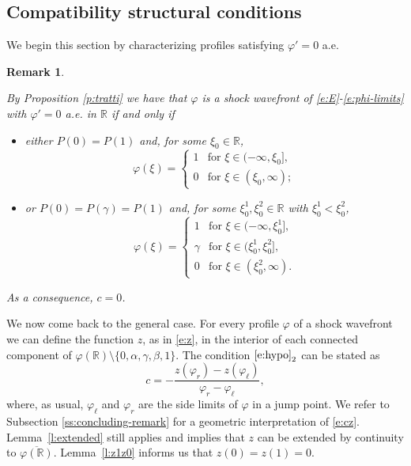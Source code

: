 \documentclass[11pt,a4paper]{article}
\newtheorem{remark}{Remark}[section]
\renewcommand{\phi}{\varphi}
\begin{document}
\subsection{Compatibility structural conditions}
\label{sec:necessary}

We begin this section by characterizing profiles satisfying $\phi'=0$ a.e.

\begin{remark}
\label{rem:2jumps}
{\rm 
By Proposition \ref{p:tratti} we have that $\phi$ is a shock wavefront of \eqref{e:E}-\eqref{e:phi-limits} with  $\phi'=0$ a.e. in $\mathbb{R}$ if and only if \begin{itemize}
\item either $P(0)=P(1)$ and, for some $\xi_0 \in \mathbb{R}$,
\[
\phi(\xi)=\begin{cases}
1 & \text{for } \xi \in (-\infty,\xi_0], \\%
0 & \text{for } \xi \in (\xi_0,\infty);
\end{cases}
\]

\item or $P(0)=P(\gamma)=P(1)$ and, for some $\xi_0^1, \xi_0^2 \in \mathbb{R}$ with $\xi_0^1 < \xi_0^2$,
\[
\phi(\xi)=\begin{cases}
1 & \text{for } \xi \in (-\infty, \xi_0^1], \\%
\gamma & \text{for } \xi \in (\xi_0^1, \xi_0^2], \\%
0 & \text{for } \xi \in (\xi_0^2,\infty).
\end{cases}
\]
\end{itemize}
As a consequence, $c=0$.}
\end{remark}
We now come back to the general case. For every profile $\varphi$ of a shock wavefront we can define the function $z$, as in \eqref{e:z}, in the interior of each connected component of $\varphi(\mathbb{R}) \setminus \{0, \alpha, \gamma, \beta, 1\}$. The condition $\eqref{e:hypo}_2$ can be stated as
\begin{equation}\label{e:cz}
c=-\frac{z(\phi_r)-z(\phi_\ell)}{\phi_r-\phi_\ell},
\end{equation}
where, as usual, $\phi_{\ell}$ and $\phi_r$ are the side limits of $\phi$ in a jump point. We refer to Subsection \ref{ss:concluding-remark} for a geometric interpretation of \eqref{e:cz}. Lemma~\ref{l:extended} still applies and implies that $z$ can be extended by continuity to $\overline{\varphi(\mathbb{R})}$. Lemma~\ref{l:z1z0} informs us that $z(0)=z(1)=0$. 
\end{document}
